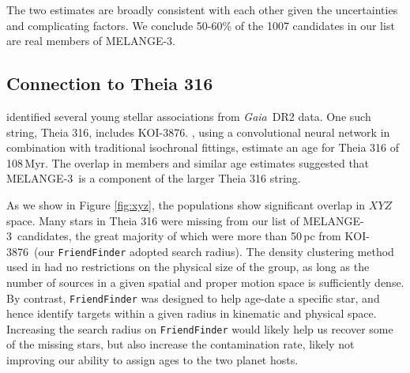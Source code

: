 \documentclass[twocolumn, linenumbers]{aastex631}
\newcommand{\association}{MELANGE-3}
\newcommand{\starname}{KOI-3876}
\newcommand\kms{km~s$^{-1}$}
\newcommand{\gaia}{\textit{Gaia}}
\begin{document}

The two estimates are broadly consistent with each other given the uncertainties and complicating factors. We conclude 50-60\% of the 1007 candidates in our list are real members of \association. 

\subsection{Connection to Theia 316}\label{sec:theia}

\citet{2019AJ....158..122K} identified several young stellar associations from \gaia\ DR2 data. One such string, Theia 316, includes \starname. \citet{2019AJ....158..122K}, using a convolutional neural network in combination with traditional isochronal fittings, estimate an age for Theia 316 of 108\,Myr. The overlap in members and similar age estimates suggested that \association\ is a component of the larger Theia 316 string. 

As we show in Figure \ref{fig:xyz}, the populations show significant overlap in $XYZ$ space. Many stars in Theia 316 were missing from our list of \association\ candidates, the great majority of which were more than 50\,pc from \starname\ (our \texttt{FriendFinder} adopted search radius). The density clustering method used in \citet{2019AJ....158..122K} had no restrictions on the physical size of the group, as long as the number of sources in a given spatial and proper motion space is sufficiently dense. By contrast, \texttt{FriendFinder} was designed to help age-date a specific star, and hence identify targets within a given radius in kinematic and physical space. Increasing the search radius on \texttt{FriendFinder} would likely help us recover some of the missing stars, but also increase the contamination rate, likely not improving our ability to assign ages to the two planet hosts. 
\end{document}
